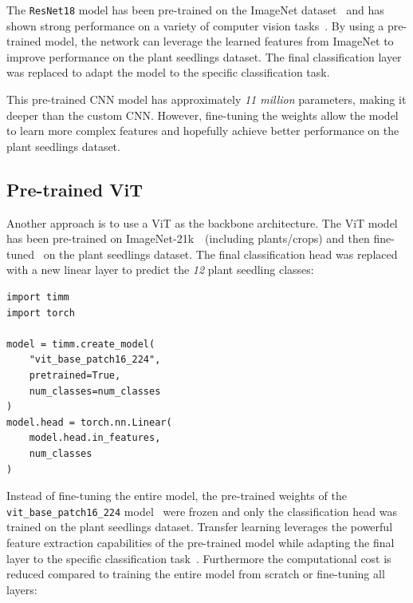The \texttt{ResNet18} model has been pre-trained on the ImageNet dataset~\cite{5206848ImageNet} and has shown strong performance on a variety of computer vision tasks~\cite{DBLP:journals/corr/HeZRS15}. By using a pre-trained model, the network can leverage the learned features from ImageNet to improve performance on the plant seedlings dataset. The final classification layer was replaced to adapt the model to the specific classification task.

This pre-trained CNN model has approximately \textit{11 million} parameters, making it deeper than the custom CNN. However, fine-tuning the weights allow the model to learn more complex features and hopefully achieve better performance on the plant seedlings dataset.

\subsection{Pre-trained ViT}

Another approach is to use a ViT as the backbone architecture. The ViT model has been pre-trained on \mbox{ImageNet-21k}~\cite{ridnik2021imagenet}~(including plants/crops) and then fine-tuned~\cite{steiner2021train} on the plant seedlings dataset. The final classification head was replaced with a new linear layer to predict the \textit{12} plant seedling classes:

\begin{minipage}{0.9\linewidth}\begin{lstlisting}[caption={Replacing the final classification layer of a pre-trained ViT model.},label={lst:pre-trained-vit}]
import timm
import torch

model = timm.create_model(
    "vit_base_patch16_224",
    pretrained=True,
    num_classes=num_classes
)
model.head = torch.nn.Linear(
    model.head.in_features,
    num_classes
)
\end{lstlisting}\end{minipage}

Instead of fine-tuning the entire model, the pre-trained weights of the \texttt{vit\_base\_patch16\_224} model~\cite{Wightman_PyTorch_Image_Models} were frozen and only the classification head was trained on the plant seedlings dataset. Transfer learning leverages the powerful feature extraction capabilities of the pre-trained model while adapting the final layer to the specific classification task~\cite[Chapter~6]{bishop2024deep}. Furthermore the computational cost is reduced compared to training the entire model from scratch or fine-tuning all layers:

